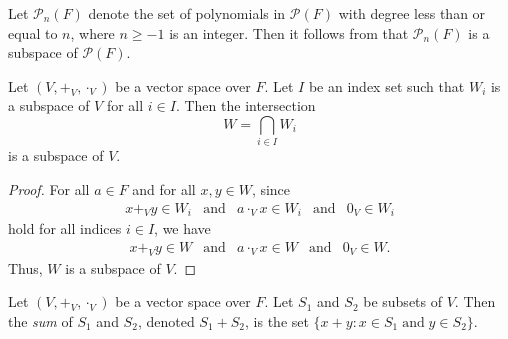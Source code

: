 \begin{example}
  Let $\mathcal{P}_n(F)$ denote the set of polynomials in $\mathcal{P}(F)$
  with degree less than or equal to $n$, where $n \geq -1$ is an integer.
  Then it follows from  that $\mathcal{P}_n(F)$ is
  a subspace of $\mathcal{P}(F)$.
\end{example}

\begin{theorem}\label{thm:intersection}
  Let $(V, +_V, \cdot_V)$ be a vector space over $F$.
  Let $I$ be an index set such that $W_i$ is a subspace of $V$
  for all $i \in I$.
  Then the intersection
  \begin{equation*}
    W = \bigcap_{i \in I} W_i
  \end{equation*}
  is a subspace of $V$.
\end{theorem}
\begin{proof}
  For all $a \in F$ and for all $x, y \in W$, since
  \begin{equation*}
    \begin{array}{lllll}
      x +_V y \in W_i
      & \text{and}
      & a \cdot_V x \in W_i
      & \text{and}
      & 0_V \in W_i
    \end{array}
  \end{equation*}
  hold for all indices $i \in I$, we have
  \begin{equation*}
    \begin{array}{lllll}
      x +_V y \in W
      & \text{and}
      & a \cdot_V x \in W
      & \text{and}
      & 0_V \in W.
    \end{array}
  \end{equation*}
  Thus, $W$ is a subspace of $V$.
\end{proof}

\begin{definition}\label{def:sum}
  Let $(V, +_V, \cdot_V)$ be a vector space over $F$.
  Let $S_1$ and $S_2$ be subsets of $V$.
  Then the \emph{sum} of $S_1$ and $S_2$, denoted $S_1 + S_2$,
  is the set
  $\{x + y: x \in S_1 \;\text{and}\; y \in S_2\}$.
\end{definition}

